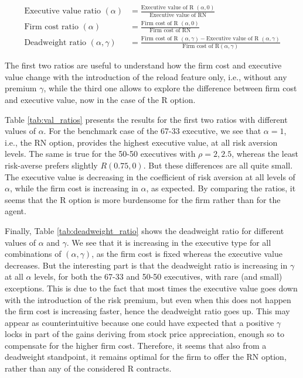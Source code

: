 \vspace{-2em}
\begin{align*}
    \text{Executive value ratio } (\alpha) &= \frac{\text{Executive value of R }(\alpha, 0)}{\text{Executive value of RN}} \\[1em]
    \text{Firm cost ratio } (\alpha) & = \frac{\text{Firm cost of R }(\alpha, 0)}{\text{Firm cost of RN}} \\[1em]
    \text{Deadweight ratio } (\alpha, \gamma) &= \frac{\text{Firm cost of R }(\alpha, \gamma) - \text{Executive value of R }(\alpha, \gamma)}{\text{Firm cost of R}(\alpha, \gamma)}
\end{align*}
\vspace{-2em}

The first two ratios are useful to understand how the firm cost and executive value change with the introduction of the reload feature only, i.e., without any premium $\gamma$, while the third one allows to explore the difference between firm cost and executive value, now in the case of the R option. %

Table \ref*{tab:val_ratios} presents the results for the first two ratios with different values of $\alpha$. For the benchmark case of the 67-33 executive, we see that $\alpha = 1$, i.e., the RN option, provides the highest executive value, at all risk aversion levels. The same is true for the 50-50 executives with $\rho = 2, 2.5$, whereas the least risk-averse prefers slightly $R(0.75,0)$. But these differences are all quite small. The executive value is decreasing in the coefficient of risk aversion at all levels of $\alpha$, while the firm cost is increasing in $\alpha$, as expected. By comparing the ratios, it seems that the R option is more burdensome for the firm rather than for the agent.  


Finally, Table \ref*{tab:deadweight_ratio} shows the deadweight ratio for different values of $\alpha$ and $\gamma$. We see that it is increasing in the executive type for all combinations of $(\alpha, \gamma)$, as the firm cost is fixed whereas the executive value decreases. But the interesting part is that the deadweight ratio is increasing in $\gamma$ at all $\alpha$ levels, for both the 67-33 and 50-50 executives, with rare (and small) exceptions. This is due to the fact that most times the executive value goes down with the introduction of the risk premium, but even when this does not happen the firm cost is increasing faster, hence the deadweight ratio goes up. This may appear as counterintuitive because one could have expected that a positive $\gamma$ locks in part of the gains deriving from stock price appreciation, enough so to compensate for the higher firm cost. 
Therefore, it seems that also from a deadweight standpoint, it remains optimal for the firm to offer the RN option, rather than any of the considered R contracts. 

